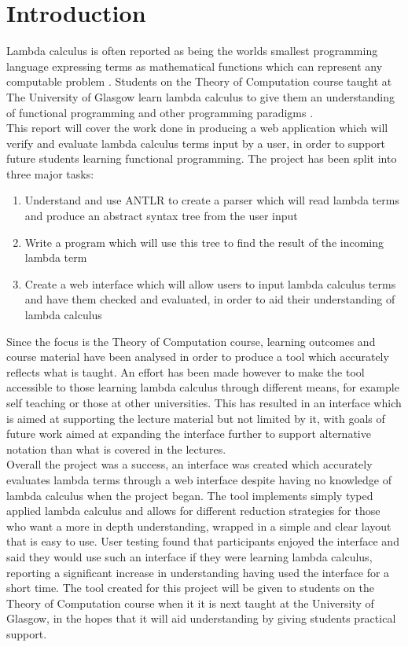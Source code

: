 \documentclass[a4paper,11pt]{report}
\begin{document}
\chapter{Introduction}
Lambda calculus is often reported as being the worlds smallest programming language \cite{Michaelson2011} expressing terms as mathematical functions which can represent any computable problem \cite{Selinger2013}. Students on the Theory of Computation course taught at The University of Glasgow learn lambda calculus to give them an understanding of functional programming and other programming paradigms \cite{CourseSpecification}.\\

This report will cover the work done in producing a web application which will verify and evaluate lambda calculus terms input by a user, in order to support future students learning functional programming. The project has been split into three major tasks:

\begin{enumerate}
	\item Understand and use ANTLR to create a parser which will read lambda terms and produce an abstract syntax tree from the user input
	\item Write a program which will use this tree to find the result of the incoming lambda term
	\item Create a web interface which will allow users to input lambda calculus terms and have them checked and evaluated, in order to aid their understanding of lambda calculus
\end{enumerate}

Since the focus is the Theory of Computation course, learning outcomes and course material have been analysed in order to produce a tool which accurately reflects what is taught. An effort has been made however to make the tool accessible to those learning lambda calculus through different means, for example self teaching or those at other universities. This has resulted in an interface which is aimed at supporting the lecture material but not limited by it, with goals of future work aimed at expanding the interface further to support alternative notation than what is covered in the lectures.\\

Overall the project was a success, an interface was created which accurately evaluates lambda terms through a web interface despite having no knowledge of lambda calculus when the project began. The tool implements simply typed applied lambda calculus and allows for different reduction strategies for those who want a more in depth understanding, wrapped in a simple and clear layout that is easy to use. User testing found that participants enjoyed the interface and said they would use such an interface if they were learning lambda calculus, reporting a significant increase in understanding having used the interface for a short time. The tool created for this project will be given to students on the Theory of Computation course when it it is next taught at the University of Glasgow, in the hopes that it will aid understanding by giving students practical support.\\
\end{document}
